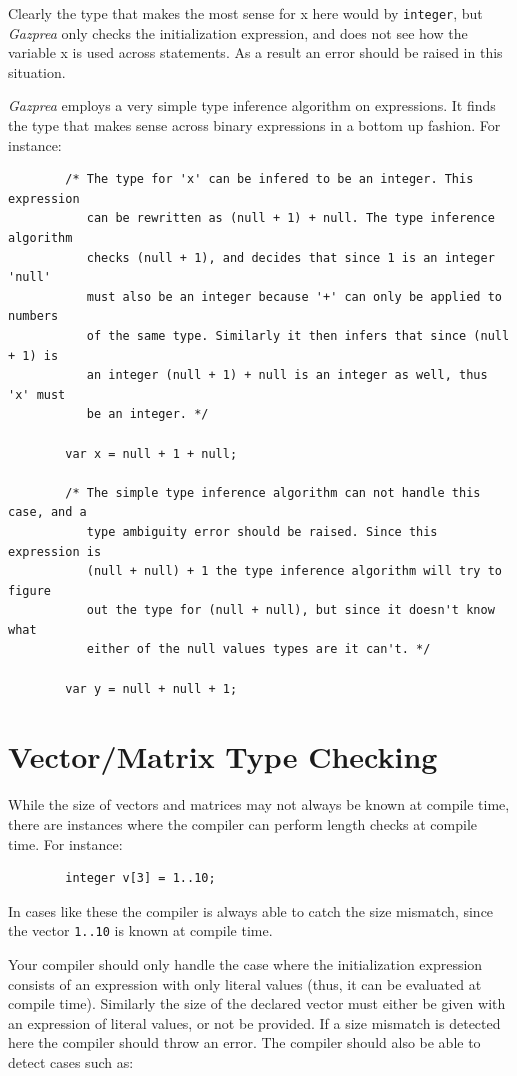 \documentclass{article}
\begin{document}
	Clearly the type that makes the most sense for x here would by \texttt{integer}, but \textit{Gazprea} only checks the
	initialization expression, and does not see how the variable x is used across statements. As a result an error
	should be raised in this situation.

	\textit{Gazprea} employs a very simple type inference algorithm on expressions.  It finds the type that makes sense
	across binary expressions in a bottom up fashion. For instance:

	\begin{lstlisting}
		/* The type for 'x' can be infered to be an integer. This expression
		   can be rewritten as (null + 1) + null. The type inference algorithm
		   checks (null + 1), and decides that since 1 is an integer 'null'
		   must also be an integer because '+' can only be applied to numbers
		   of the same type. Similarly it then infers that since (null + 1) is
		   an integer (null + 1) + null is an integer as well, thus 'x' must
		   be an integer. */

		var x = null + 1 + null;

		/* The simple type inference algorithm can not handle this case, and a
		   type ambiguity error should be raised. Since this expression is
		   (null + null) + 1 the type inference algorithm will try to figure
		   out the type for (null + null), but since it doesn't know what
		   either of the null values types are it can't. */

		var y = null + null + 1;
	\end{lstlisting}


\section{Vector/Matrix Type Checking}\label{sec:typeChecking}


	While the size of vectors and matrices may not always be known at compile time, there are instances where the
	compiler can perform length checks at compile time. For instance:

	\begin{lstlisting}
		integer v[3] = 1..10;
	\end{lstlisting}

	In cases like these the compiler is always able to catch the size mismatch, since the vector \texttt{1..10} is known
	at compile time.

	Your compiler should only handle the case where the initialization expression consists of an expression with only
	literal values (thus, it can be evaluated at compile time). Similarly the size of the declared vector must either be
	given with an expression of literal values, or not be provided. If a size mismatch is detected here the compiler
	should throw an error. The compiler should also be able to detect cases such as:
\end{document}
